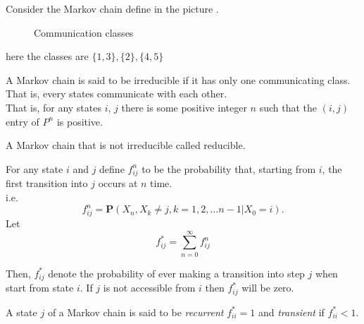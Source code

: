 \begin{example}[]
    Consider the Markov chain define in the picture .
\begin{figure}[h]
    \centering
    \caption{Communication classes}
    \label{example of communication}
\end{figure}

here the classes are $\{ 1,3 \}, \{2\}, \{4,5\}$
\end{example}

\begin{definition}
    A Markov chain is said to be irreducible if it has only one communicating class. That is, every states communicate with each other.\\ 
    That is, for any states $i$, $j$ there is some positive integer $n$ such that the $(i, j)$ entry of $ P^{n} $ is positive.
\end{definition}

A Markov chain that is not irreducible called reducible.

For any state $ i $ and $ j $ define $ f^{n}_{ij} $ to be the probability that, starting from $ i $, the first transition into $ j  $
occurs at $ n $ time. \\ 
i.e. 
\[
    f^{n}_{ij} = \mathbf{P}(X_{n},X_{k}\neq j, k=1,2,\ldots n-1|X_{0}=i).
\]
Let
\[
    f^*_{ij}=\sum_{n=0}^{\infty} f^{n}_{ij}
\]

Then, $ f^*_{ij} $ denote the probability of ever making a transition into step $ j $ when start from state $ i $. 
If $ j $ is not accessible from $ i $ then $ f^*_{ij} $ will be zero.
\begin{definition}
    A state $ j $ of a Markov chain is said to be \textit{recurrent}  $ f^*_{ii}=1 $ and \textit{transient}  if $ f^*_{ii}<1 $.
\end{definition}

